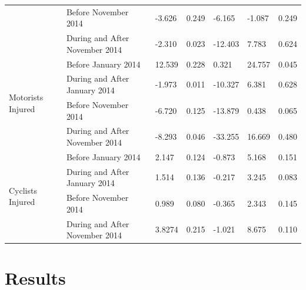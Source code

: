 \documentclass[10pt,journal,compsoc]{IEEEtran}
\begin{document}
\begin{table}[]
\begin{tabular}{|l|l|l|l|l|l|l|}
                                     & Before November 2014 & -3.626      & 0.249 & -6.165                 & -1.087               & 0.249   \\ \cline{2-7} 
                                     & During and After November 2014  & -2.310      & 0.023 & -12.403                & 7.783                & 0.624   \\ \hline
\multirow{4}{*}{Motorists Injured}   & Before January 2014 & 12.539      & 0.228 & 0.321                  & 24.757               & 0.045   \\ \cline{2-7} 
                                     & During and After January 2014  & -1.973      & 0.011 & -10.327                & 6.381                & 0.628   \\ \cline{2-7} 
                                     & Before November 2014 & -6.720      & 0.125 & -13.879                & 0.438                & 0.065   \\ \cline{2-7} 
                                     & During and After November 2014  & -8.293      & 0.046 & -33.255                & 16.669               & 0.480   \\ \hline
\multirow{4}{*}{Cyclists Injured}    & Before January 2014 & 2.147       & 0.124 & -0.873                 & 5.168                & 0.151   \\ \cline{2-7} 
                                     & During and After January 2014  & 1.514       & 0.136 & -0.217                 & 3.245                & 0.083   \\ \cline{2-7} 
                                     & Before November 2014 & 0.989       & 0.080 & -0.365                 & 2.343                & 0.145   \\ \cline{2-7} 
                                     & During and After November 2014  & 3.8274      & 0.215 & -1.021                 & 8.675                & 0.110   \\ \hline
\end{tabular}
\end{table}


\section{Results}
\end{document}
